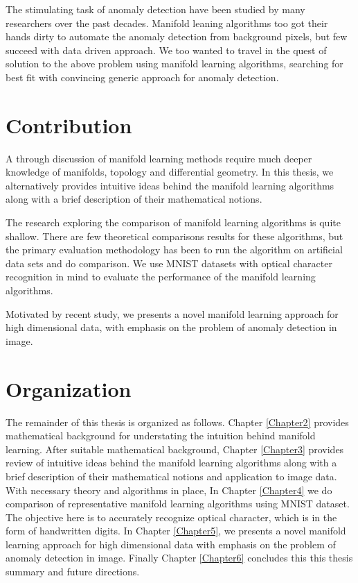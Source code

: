 The stimulating task of anomaly detection have been studied by many researchers over the past decades. Manifold leaning algorithms too got their hands dirty to automate the anomaly detection from background pixels, but few succeed with data driven approach. We too wanted to travel in the quest of solution to the above problem using manifold learning algorithms, searching for best fit with convincing generic approach for anomaly detection.

\section{Contribution}

A through discussion of manifold learning methods require much deeper 
knowledge of manifolds, topology and differential geometry.  In this thesis, we alternatively provides intuitive ideas behind the manifold learning algorithms along with a brief description of their mathematical notions.

The research exploring the comparison of manifold learning algorithms is quite shallow. There are few theoretical comparisons results for these algorithms, but the primary evaluation methodology has been to run the
algorithm on artificial data sets and do comparison. We use MNIST datasets with optical character recognition in mind to evaluate the performance of the manifold learning algorithms.

Motivated by recent study, we presents a novel manifold learning approach for high dimensional data, with emphasis on the problem of anomaly detection in image.

\section{Organization}

The remainder of this thesis is organized as follows. Chapter \ref{Chapter2} provides mathematical background for understating the intuition behind manifold learning. After suitable mathematical background, Chapter \ref{Chapter3} provides review of intuitive ideas behind the manifold learning algorithms along with a brief description of their mathematical notions and application to image data. With necessary theory and algorithms in place, In Chapter \ref{Chapter4} we do comparison of representative manifold learning algorithms using MNIST dataset. The objective here is to accurately recognize optical character, which is in the form of handwritten digits. In Chapter \ref{Chapter5}, we presents a novel manifold learning approach for high dimensional data with emphasis on the problem of anomaly detection in image. Finally Chapter \ref{Chapter6} concludes this this thesis summary and future directions.


 



